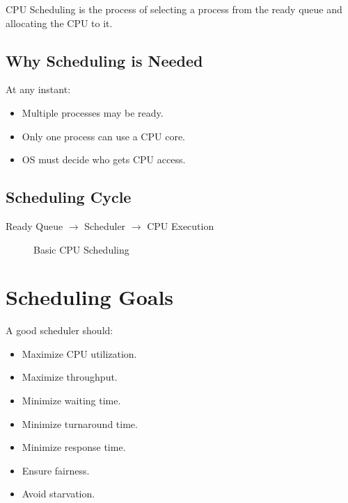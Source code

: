 CPU Scheduling is the process of selecting a process from the ready queue and allocating the CPU to it.

\subsection{Why Scheduling is Needed}

At any instant:

\begin{itemize}
\item Multiple processes may be ready.
\item Only one process can use a CPU core.
\item OS must decide who gets CPU access.
\end{itemize}

\subsection{Scheduling Cycle}

\begin{center}
Ready Queue $\rightarrow$ Scheduler $\rightarrow$ CPU Execution
\end{center}

\begin{figure}[H]
\centering
{}
\caption{Basic CPU Scheduling}
\end{figure}

\section{Scheduling Goals}

A good scheduler should:

\begin{itemize}
\item Maximize CPU utilization.
\item Maximize throughput.
\item Minimize waiting time.
\item Minimize turnaround time.
\item Minimize response time.
\item Ensure fairness.
\item Avoid starvation.
\end{itemize}

